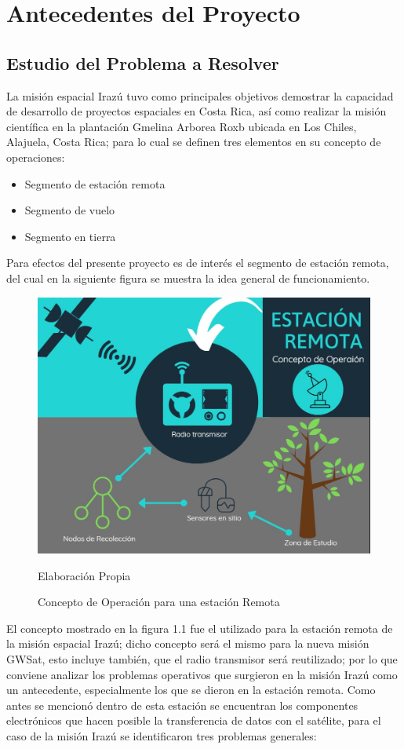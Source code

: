 \section{Antecedentes del Proyecto}
\subsection{Estudio del Problema a Resolver}
La misión espacial Irazú tuvo como principales objetivos demostrar la capacidad de desarrollo de proyectos espaciales en Costa Rica, así como realizar la misión científica en la plantación Gmelina Arborea Roxb ubicada en Los Chiles, Alajuela, Costa Rica; para lo cual se definen tres elementos en su concepto de operaciones: \cite{2} 
\begin{itemize}
    \item Segmento de estación remota
    \item Segmento de vuelo
    \item Segmento en tierra
\end{itemize}

Para efectos del presente proyecto es de interés el segmento de estación remota, del cual en la siguiente figura se muestra la idea general de funcionamiento.

\begin{figure}[H]
\centering
\includegraphics[scale=0.37]{Figuras/concepto_de_operacion_1.jpg}
\caption{Concepto de Operación para una estación Remota}
Elaboración Propia
\label{concepto de operacion}
\end{figure}

El concepto mostrado en la figura 1.1 fue el utilizado para la estación remota de la misión espacial Irazú; dicho concepto será el mismo para la nueva misión GWSat, esto incluye también, que el radio transmisor será reutilizado; por lo que conviene analizar los problemas operativos que surgieron en la misión Irazú como un antecedente, especialmente los que se dieron en la estación remota. Como antes se mencionó dentro de esta estación se encuentran los componentes electrónicos que hacen posible la transferencia de datos con el satélite, para el caso de la misión Irazú se identificaron tres problemas generales:

